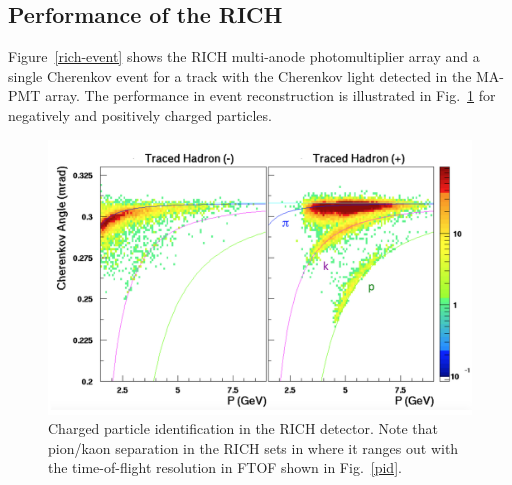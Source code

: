 \documentclass[final,3p,twocolumn]{elsarticle}
\begin{document}
\subsection{Performance of the RICH} 

Figure~\ref{rich-event} shows the RICH multi-anode photomultiplier array and a single Cherenkov event for a
track with the Cherenkov light detected in the MA-PMT array.  The performance in event reconstruction is
illustrated in Fig.~\ref{rich_rec} for negatively and positively charged particles. 

\begin{figure}[htbp!]
\centerline{\includegraphics[width=1.0\columnwidth]{RICH_rec.png}}
\caption{Charged particle identification in the RICH detector. Note that pion/kaon separation in the RICH sets
in where it ranges out with the time-of-flight resolution in FTOF shown in Fig.~\ref{pid}.}
\label{rich_rec}
\end{figure}
\end{document}
